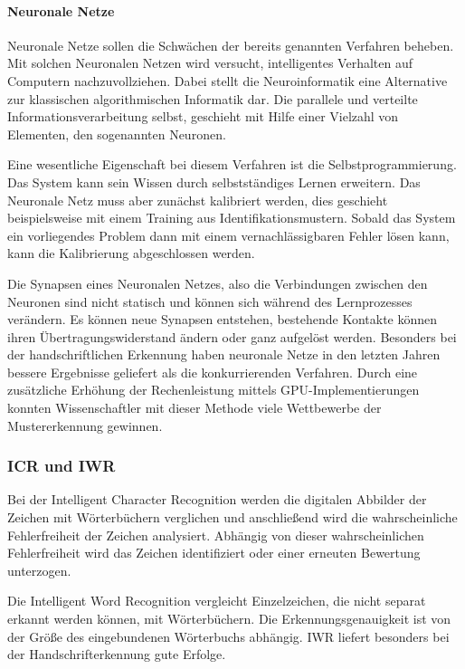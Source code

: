 \paragraph{Neuronale Netze}
Neuronale Netze sollen die Schwächen der bereits genannten Verfahren beheben. Mit solchen Neuronalen Netzen wird versucht, intelligentes Verhalten auf Computern nachzuvollziehen. Dabei stellt die Neuroinformatik eine Alternative zur klassischen algorithmischen Informatik dar. Die parallele und verteilte Informationsverarbeitung selbst, geschieht mit Hilfe einer Vielzahl von Elementen, den sogenannten Neuronen.

Eine wesentliche Eigenschaft bei diesem Verfahren ist die Selbstprogrammierung. Das System kann sein Wissen durch selbstständiges Lernen erweitern. Das Neuronale Netz muss aber zunächst kalibriert werden, dies geschieht beispielsweise mit einem Training aus Identifikationsmustern. Sobald das System ein vorliegendes Problem dann mit einem vernachlässigbaren Fehler lösen kann, kann die Kalibrierung abgeschlossen werden.

Die Synapsen eines Neuronalen Netzes, also die Verbindungen zwischen den Neuronen sind nicht statisch und können sich während des Lernprozesses verändern. Es können neue Synapsen entstehen, bestehende Kontakte können ihren Übertragungswiderstand ändern oder ganz aufgelöst werden. Besonders bei der handschriftlichen Erkennung haben neuronale Netze in den letzten Jahren bessere Ergebnisse geliefert als die konkurrierenden Verfahren. Durch eine zusätzliche Erhöhung der Rechenleistung mittels GPU-Implementierungen konnten Wissenschaftler mit dieser Methode viele Wettbewerbe der Mustererkennung gewinnen. \cite{OCRB}

\subsubsection{ICR und IWR}
Bei der Intelligent Character Recognition werden die digitalen Abbilder der Zeichen mit Wörterbüchern verglichen und anschließend wird die wahrscheinliche Fehlerfreiheit der Zeichen analysiert. Abhängig von dieser wahrscheinlichen Fehlerfreiheit wird das Zeichen identifiziert oder einer erneuten Bewertung unterzogen.

Die Intelligent Word Recognition vergleicht Einzelzeichen, die nicht separat erkannt werden können, mit Wörterbüchern. Die Erkennungsgenauigkeit ist von der Größe des eingebundenen Wörterbuchs abhängig. IWR liefert besonders bei der Handschrifterkennung gute Erfolge.

